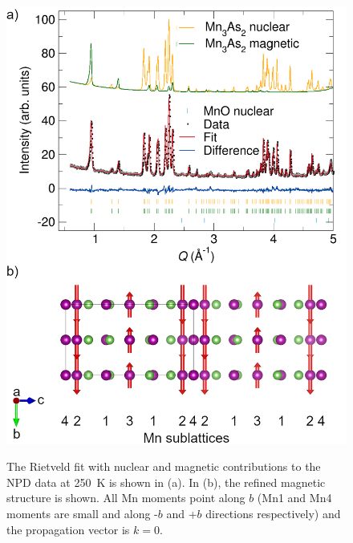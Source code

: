 \documentclass[10pt,doublespacing,edeposit]{uiucthesis2020}
\begin{document}
\begin{mainmatter}
\begin{figure}
\centering\includegraphics[width=0.75\columnwidth]{figures/ch6/250K_mag_structure.png} \\
\caption{The Rietveld fit with nuclear and magnetic contributions to the NPD data at 250~K is shown in (a). In (b), the refined magnetic structure is shown. All Mn moments point along $b$ (Mn1 and Mn4 moments are small and along -$b$ and +$b$ directions respectively) and the propagation vector is $k = 0$. 
}
\label{fig:250K_data}
\end{figure}


\end{mainmatter}
\end{document}
